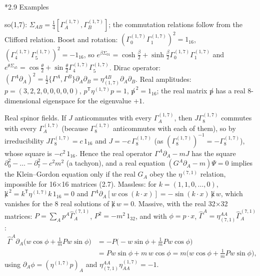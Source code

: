 \documentclass[10pt,a4paper]{article}
\makeatletter
\renewcommand\subsection{\@startsection{subsection}{2}{\z@}{-3.25ex\@plus -1ex \@minus -.2ex}{1.5ex \@plus .2ex}{\normalfont\large\bfseries\raggedright}}
\makeatother
\begin{document}
\subsection*{2.9 Examples}
so(1,7): $\Sigma_{AB}=\frac14[\Gamma^{(1,7)}_A,\Gamma^{(1,7)}_B]$; the commutation relations follow from the Clifford relation. Boost and rotation: $(\Gamma^{(1,7)}_0\Gamma^{(1,7)}_1)^2=1_{16}$, $(\Gamma^{(1,7)}_4\Gamma^{(1,7)}_5)^2=-1_{16}$, so $e^{\beta\Sigma_{01}}=\cosh\frac\beta2+\sinh\frac\beta2\Gamma^{(1,7)}_0\Gamma^{(1,7)}_1$ and $e^{\theta\Sigma_{45}}=\cos\frac\theta2+\sin\frac\theta2\Gamma^{(1,7)}_4\Gamma^{(1,7)}_5$. Dirac operator: $(\Gamma^A\partial_A)^2=\frac12\lbrace\Gamma^A,\Gamma^B\rbrace\partial_A\partial_B=\eta_{(1,7)}^{AB}\partial_A\partial_B$. Real amplitudes: $p=(3,2,2,0,0,0,0,0)$, $p^{\mathsf T}\eta^{(1,7)}p=1$, $\not p^{\,2}=1_{16}$; the real matrix $\not p$ has a real 8-dimensional eigenspace for the eigenvalue $+1$.

Real spinor fields. If $J$ anticommutes with every $\Gamma^{(1,7)}_A$, then $J\Gamma^{(1,7)}_8$ commutes with every $\Gamma^{(1,7)}_A$ (because $\Gamma^{(1,7)}_8$ anticommutes with each of them), so by irreducibility $J\Gamma^{(1,7)}_8=c\,1_{16}$ and $J=-c\,\Gamma^{(1,7)}_8$ (as $(\Gamma^{(1,7)}_8)^{-1}=-\Gamma^{(1,7)}_8$), whose square is $-c^2\,1_{16}$. Hence the real operator $\Gamma^A\partial_A-mJ$ has the square $\partial_0^2-\dots-\partial_7^2-c^2m^2$ (a tachyon), and a real equation $(G^A\partial_A-m)\Psi=0$ implies the Klein–Gordon equation only if the real $G_A$ obey the $\eta^{(7,1)}$ relation, impossible for 16×16 matrices (2.7). Massless: for $k=(1,1,0,\dots,0)$, $\not k^{\,2}=k^{\mathsf T}\eta^{(1,7)}k\,1_{16}=0$ and $\Gamma^A\partial_A[w\cos(k\cdot x)]=-\sin(k\cdot x)\,\not k\,w$, which vanishes for the 8 real solutions of $\not k\,w=0$. Massive, with the real 32×32 matrices: $P=\sum_Ap^A\widehat\Gamma^{(7,1)}_A$, $P^2=-m^2\,1_{32}$, and with $\phi=p\cdot x$, $\widehat\Gamma^A=\eta_{(7,1)}^{AA}\widehat\Gamma^{(7,1)}_A$:
\begin{align*}
\widehat\Gamma^{A}\partial_A\Big(w\cos\phi+\tfrac1mPw\sin\phi\Big)&=-P\Big(-w\sin\phi+\tfrac1mPw\cos\phi\Big) \\
&=Pw\sin\phi+m\,w\cos\phi=m\Big(w\cos\phi+\tfrac1mPw\sin\phi\Big),
\end{align*}
using $\partial_A\phi=(\eta^{(1,7)}p)_A$ and $\eta_{(7,1)}^{AA}\eta^{(1,7)}_{AA}=-1$.
\end{document}
